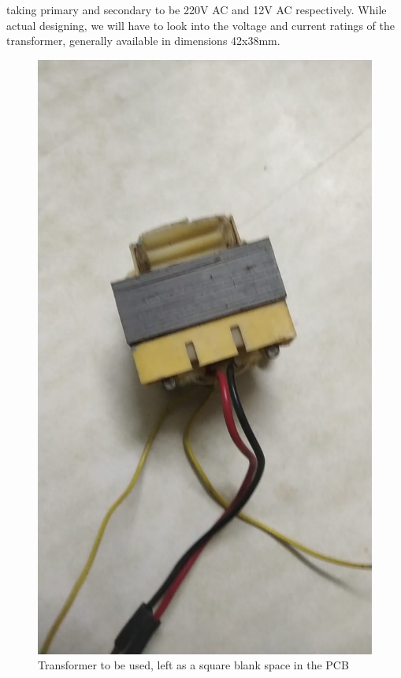 \documentclass{article}
\begin{document}
taking primary and secondary to be 220V AC and 12V AC respectively.
While actual designing, we will have to look into the voltage and current ratings of the transformer, generally available in dimensions 42x38mm.
\begin{figure}[h!]
\centerline{\includegraphics[scale=.2]{Images/ab.jpeg}}
\caption{Transformer to be used, left as a square blank space in the PCB}
\label{figb}
\end{figure}
\end{document}
